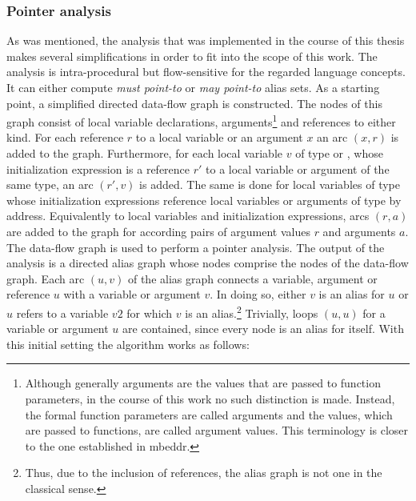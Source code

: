 \subsubsection*{Pointer analysis}
As was mentioned, the analysis that was implemented in the course of this thesis makes several simplifications in order to fit into the scope of this work. The analysis is intra-procedural but flow-sensitive for the regarded language concepts. It can either compute \textit{must point-to} or \textit{may point-to} alias sets.
As a starting point, a simplified directed data-flow graph is constructed. The nodes of this graph consist of local variable declarations, arguments\footnote{Although generally arguments are the values that are passed to function parameters, in the course of this work no such distinction is made. Instead, the formal function parameters are called arguments and the values, which are passed to functions, are called argument values. This terminology is closer to the one established in mbeddr.} and references to either kind. For each reference $r$ to a local variable or an argument $x$ an arc $(x, r)$ is added to the graph. Furthermore, for each local variable $v$ of type  or , whose initialization expression is a reference $r'$ to a local variable or argument of the same type, an arc $(r', v)$ is added. The same is done for local variables of type  whose initialization expressions reference local variables or arguments of type  by address. Equivalently to local variables and initialization expressions, arcs $(r, a)$ are added to the graph for according pairs of argument values $r$ and arguments $a$.
The data-flow graph is used to perform a pointer analysis. The output of the analysis is a directed alias graph whose nodes comprise the nodes of the data-flow graph. Each arc $(u, v)$ of the alias graph connects a variable, argument or reference $u$ with a variable or argument $v$. In doing so, either $v$ is an alias for $u$ or $u$ refers to a variable $v2$ for which $v$ is an alias.\footnote{Thus, due to the inclusion of references, the alias graph is not one in the classical sense.} Trivially, loops $(u, u)$ for a variable or argument $u$ are contained, since every node is an alias for itself. With this initial setting the algorithm works as follows:
